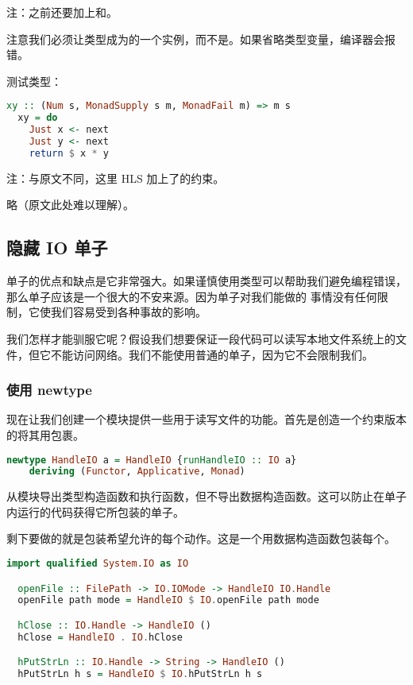 \documentclass[./main.tex]{subfiles}
\begin{document}
注：之前还要加上和。

注意我们必须让类型成为的一个实例，而不是。如果省略类型变量，编译器会报错。

测试类型：

\begin{lstlisting}[language=Haskell]
  xy :: (Num s, MonadSupply s m, MonadFail m) => m s
  xy = do
    Just x <- next
    Just y <- next
    return $ x * y
\end{lstlisting}

注：与原文不同，这里 HLS 加上了的约束。

略（原文此处难以理解）。

\subsection*{隐藏 IO 单子}

单子的优点和缺点是它非常强大。如果谨慎使用类型可以帮助我们避免编程错误，那么单子应该是一个很大的不安来源。因为单子对我们能做的
事情没有任何限制，它使我们容易受到各种事故的影响。

我们怎样才能驯服它呢？假设我们想要保证一段代码可以读写本地文件系统上的文件，但它不能访问网络。我们不能使用普通的单子，因为它不会限制我们。

\subsubsection*{使用 newtype}

现在让我们创建一个模块提供一些用于读写文件的功能。首先是创造一个约束版本的将其用包裹。

\begin{lstlisting}[language=Haskell]
  newtype HandleIO a = HandleIO {runHandleIO :: IO a}
    deriving (Functor, Applicative, Monad)
\end{lstlisting}

从模块导出类型构造函数和执行函数，但不导出数据构造函数。这可以防止在单子内运行的代码获得它所包装的单子。

剩下要做的就是包装希望允许的每个动作。这是一个用数据构造函数包装每个。

\begin{lstlisting}[language=Haskell]
  import qualified System.IO as IO

  openFile :: FilePath -> IO.IOMode -> HandleIO IO.Handle
  openFile path mode = HandleIO $ IO.openFile path mode

  hClose :: IO.Handle -> HandleIO ()
  hClose = HandleIO . IO.hClose

  hPutStrLn :: IO.Handle -> String -> HandleIO ()
  hPutStrLn h s = HandleIO $ IO.hPutStrLn h s
\end{lstlisting}
\end{document}

